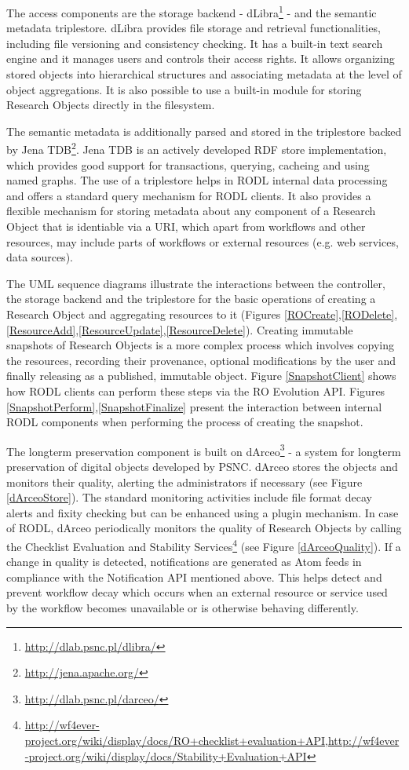The access components are the storage backend - dLibra\footnote{\url{http://dlab.psnc.pl/dlibra/}} - and the semantic metadata triplestore. dLibra provides file storage and retrieval functionalities, including file versioning and consistency checking. It has a built-in text search engine and it manages users and controls their access rights. It allows organizing stored objects into hierarchical structures and associating metadata at the level of object aggregations. It is also possible to use a built-in module for storing Research Objects directly in the filesystem.

The semantic metadata is additionally parsed and stored in the triplestore backed by Jena TDB\footnote{\url{http://jena.apache.org/}}. Jena TDB is an actively developed RDF store implementation, which provides good support for transactions, querying, cacheing and using named graphs. The use of a triplestore helps in RODL internal data processing and offers a standard query mechanism for RODL clients. It also provides a flexible mechanism for storing metadata about any component of a Research Object that is identiable via a URI, which apart from workflows and other resources, may include parts of workflows or external resources (e.g. web services, data sources).

The UML sequence diagrams illustrate the interactions between the controller, the storage backend and the triplestore for the basic operations of creating a Research Object and aggregating resources to it (Figures \ref{ROCreate},\ref{RODelete},\ref{ResourceAdd},\ref{ResourceUpdate},\ref{ResourceDelete}). Creating immutable snapshots of Research Objects is a more complex process which involves copying the resources, recording their provenance, optional modifications by the user and finally releasing as a published, immutable object. Figure \ref{SnapshotClient} shows how RODL clients can perform these steps via the RO Evolution API. Figures \ref{SnapshotPerform},\ref{SnapshotFinalize} present the interaction between internal RODL components when performing the process of creating the snapshot.

The longterm preservation component is built on dArceo\footnote{\url{http://dlab.psnc.pl/darceo/}} - a system for longterm preservation of digital objects developed by PSNC. dArceo stores the objects and monitors their quality, alerting the administrators if necessary (see Figure \ref{dArceoStore}). The standard monitoring activities include file format decay alerts and fixity checking but can be enhanced using a plugin mechanism. In case of RODL, dArceo periodically monitors the quality of Research Objects by calling the Checklist Evaluation and Stability Services\footnote{\url{http://wf4ever-project.org/wiki/display/docs/RO+checklist+evaluation+API},\url{http://wf4ever-project.org/wiki/display/docs/Stability+Evaluation+API}}  (see Figure \ref{dArceoQuality}). If a change in quality is detected, notifications are generated as Atom feeds in compliance with the Notification API mentioned above. This helps detect and prevent workflow decay which occurs when an external resource or service used by the workflow becomes unavailable or is otherwise behaving differently.

